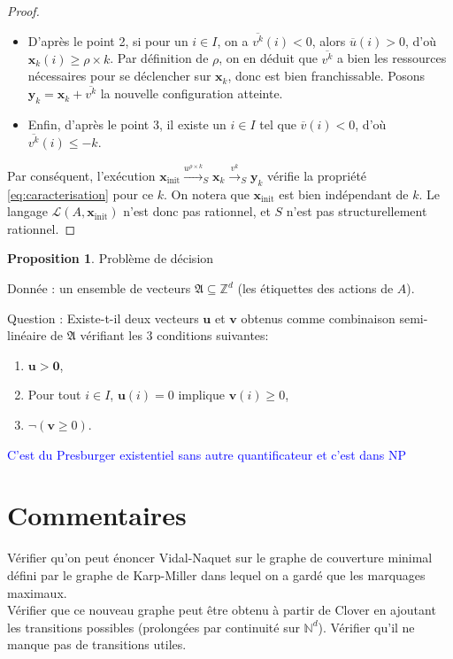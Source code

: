 \documentclass[a4paper,final]{article}
\theoremstyle{definition}
\newtheorem{Proposition}[Theorem]{Proposition}
\let\leq\leqslant
\let\geq\geqslant
\newcommand{\alain}[1]{\textcolor{blue}{#1}}
\newcommand{\N}{\ensuremath{\mathbb{N}}}
\newcommand{\Z}{\ensuremath{\mathbb{Z}}}
\newcommand{\lang}{\ensuremath{\mathcal{L}}}
\newcommand{\trans}[2]{\ensuremath{\stackrel{#1}{\longrightarrow}_{#2}}}
\newcommand{\vect}[1]{\ensuremath{\mathbf{#1}}}
\newcommand{\xinit}{\ensuremath{\vect{x}_\text{init}}}
\newcommand{\valeur}[1]{\ensuremath{\overline{#1}}}
\begin{document}
\begin{proof}
\begin{itemize}
    \item D'après le point 2, si pour un $i\in I$, on a $\valeur{v^k}(i) < 0$, alors $\valeur{u}(i) > 0$, d'où $\vect{x}_k(i) \geq \rho\times k$.
    Par définition de $\rho$, on en déduit que $\valeur{v^k}$ a bien les ressources nécessaires pour se déclencher sur $\vect{x}_k$, donc est bien franchissable.
    Posons $\vect{y}_k = \vect{x}_k + \valeur{v^k}$ la nouvelle configuration atteinte.
    
    \item Enfin, d'après le point 3, il existe un $i\in I$ tel que $\valeur{v}(i) < 0$, d'où $\valeur{v^k}(i) \leq -k$.
\end{itemize}
Par conséquent, l'exécution $\xinit \trans{u^{\rho\times k}}{S} \vect{x}_k \trans{v^k}{S} \vect{y}_k$ vérifie la propriété \eqref{eq:caracterisation} pour ce $k$.
On notera que $\xinit$ est bien indépendant de $k$.
Le langage $\lang(A,\xinit)$ n'est donc pas rationnel, et $S$ n'est pas structurellement rationnel.
\end{proof}

\begin{Proposition}
Problème de décision

Donnée : un ensemble de vecteurs $\mathfrak{A} \subseteq \Z^d$ (les étiquettes des actions de $A$).

Question : Existe-t-il deux vecteurs $\vect{u}$ et $\vect{v}$ obtenus comme combinaison semi-linéaire de $\mathfrak{A}$ vérifiant les 3 conditions suivantes:
\begin{enumerate}
    \item $\vect{u} > \vect{0}$,
    \item Pour tout $i \in I$, $\vect{u}(i)=0$ implique $\vect{v}(i) \geq 0$,
    \item  $\lnot(\vect{v} \geq 0)$.
\end{enumerate}

\end{Proposition}
\alain{C'est du Presburger existentiel sans autre quantificateur et c'est dans NP}

\section{Commentaires}
Vérifier qu'on peut énoncer Vidal-Naquet sur le graphe de couverture minimal défini par le graphe de Karp-Miller dans lequel on a gardé que les marquages maximaux.\\
Vérifier que ce nouveau graphe peut être obtenu à partir de Clover en ajoutant les transitions possibles (prolongées par continuité sur $\N^d$). Vérifier qu'il ne manque pas de transitions utiles.
\end{document}

